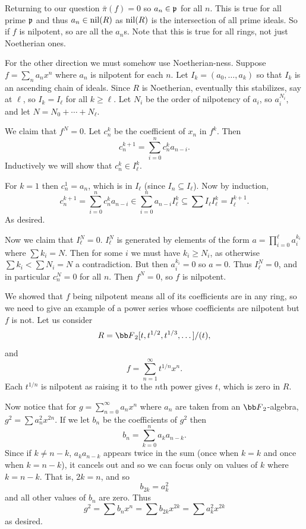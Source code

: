     Returning to our question $\bar\pi(f)=0$ so $a_n\in{{\frak p}}$ for all $n$.
    This is true for all prime ${{\frak p}}$ and thus $a_n\in{\rm nil}(R)$ as ${\rm nil}(R)$ is the intersection of all prime ideals.
    So if $f$ is nilpotent, so are all the $a_n$s.
    Note that this is true for all rings, not just Noetherian ones.

    For the other direction we must somehow use Noetherian-ness.
    Suppose $f=\sum_na_nx^n$ where $a_n$ is nilpotent for each $n$.
    Let $I_k=(a_0,\dots,a_k)$ so that $I_k$ is an ascending chain of ideals.
    Since $R$ is Noetherian, eventually this stabilizes, say at $\ell$, so $I_k=I_\ell$ for all $k\geq\ell$.
    Let $N_i$ be the order of nilpotency of $a_i$, so $a_i^{N_i}$, and let $N=N_0+\cdots+N_\ell$.

    We claim that $f^N=0$.
    Let $c_n^k$ be the coefficient of $x_n$ in $f^k$.
    Then
    $$ c_n^{k+1} = \sum_{i=0}^n c_n^ka_{n-i} . $$
    Inductively we will show that $c_n^k\in I_\ell^k$.

    For $k=1$ then $c_n^1=a_n$, which is in $I_\ell$ (since $I_n\subseteq I_\ell$).
    Now by induction,
    $$ c_n^{k+1} = \sum_{i=0}^n c_n^ka_{n-i} \in \sum_{i=0}^n a_{n-i}I_\ell^k \subseteq \sum I_\ell I_\ell^k = I_\ell^{k+1} . $$
    As desired.

    Now we claim that $I_\ell^N=0$.
    $I_\ell^N$ is generated by elements of the form $a=\prod_{i=0}^\ell a_i^{k_i}$ where $\sum k_i=N$.
    Then for some $i$ we must have $k_i\geq N_i$, as otherwise $\sum k_i<\sum N_i=N$ a contradiction.
    But then $a_i^{k_i}=0$ so $a=0$.
    Thus $I_\ell^N=0$, and in particular $c_n^N=0$ for all $n$.
    Then $f^N=0$, so $f$ is nilpotent.

    \item We showed that $f$ being nilpotent means all of its coefficients are in any ring, so we need to give an example
    of a power series whose coefficients are nilpotent but $f$ is not.
    Let us consider
    $$ R = \bF_2[t,t^{1/2},t^{1/3},\dots]/(t) , $$
    and
    $$ f = \sum_{n=1}^\infty t^{1/n}x^n . $$
    Each $t^{1/n}$ is nilpotent as raising it to the $n$th power gives $t$, which is zero in $R$.
    
    Now notice that for $g=\sum_{n=0}^\infty a_nx^n$ where $a_n$ are taken from an $\bF_2$-algebra,
    $g^2=\sum a_n^2x^{2n}$.
    If we let $b_n$ be the coefficients of $g^2$ then
    $$ b_n = \sum_{k=0}^n a_ka_{n-k} . $$
    Since if $k\neq n-k$, $a_ka_{n-k}$ appears twice in the sum (once when $k=k$ and once when $k=n-k$), it cancels out
    and so we can focus only on values of $k$ where $k=n-k$.
    That is, $2k=n$, and so
    $$ b_{2k} = a_k^2 $$
    and all other values of $b_n$ are zero.
    Thus
    $$ g^2 = \sum b_nx^n = \sum b_{2k}x^{2k} = \sum a_k^2x^{2k} $$
    as desired.

